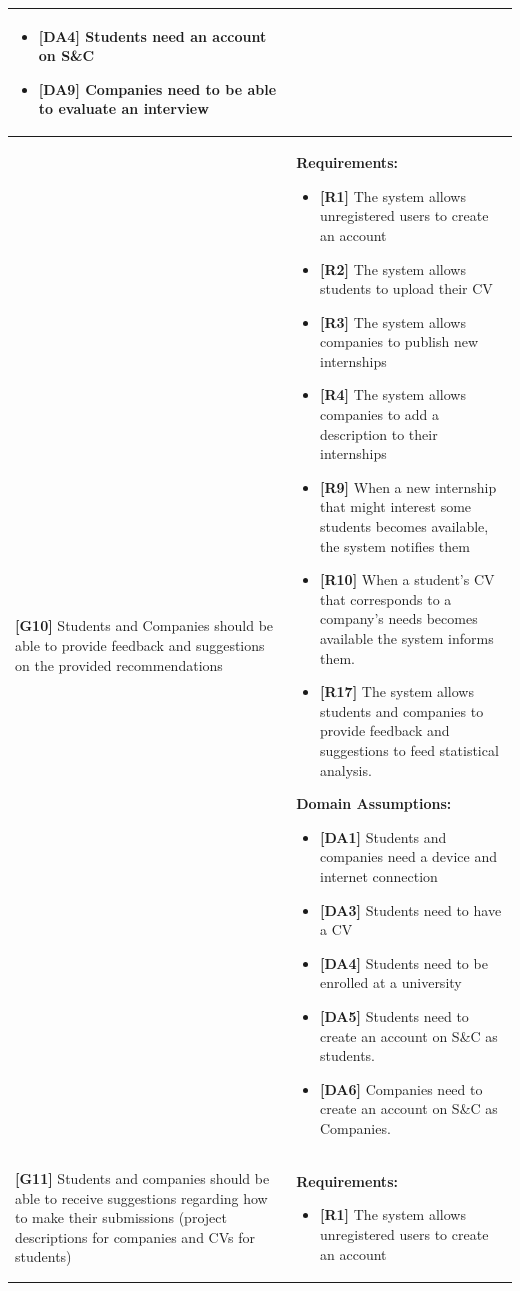 \begin{longtable}{|p{}|p{}|}
\begin{itemize}
    \item \textbf{[DA4]} Students need an account on S\&C
    \item \textbf{[DA9]} Companies need to be able to evaluate an interview
\end{itemize} \\
\hline
\textbf{[G10]} Students and Companies should be able to provide feedback and suggestions on the provided recommendations
& 
\textbf{Requirements:}
\begin{itemize}
    \item \textbf{[R1]} The system allows unregistered users to create an account
    \item \textbf{[R2]} The system allows students to upload their CV
    \item \textbf{[R3]} The system allows companies to publish new internships
    \item \textbf{[R4]} The system allows companies to add a description to their internships
    \item  \textbf{[R9]} When a new internship that might interest some students becomes available, the system notifies them
    \item  \textbf{[R10]} When a student’s CV that corresponds to a company’s needs becomes available the system informs them.
    \item \textbf{[R17]} The system allows students and companies to provide feedback and suggestions to feed statistical analysis.
\end{itemize}
\textbf{Domain Assumptions:}
\begin{itemize}
    \item \textbf{[DA1]} Students and companies need a device and internet connection
     \item \textbf{[DA3]} Students need to have a CV
     \item \textbf{[DA4]} Students need to be enrolled at a university
    \item \textbf{[DA5]} Students need to create an account on S\&C as students.
    \item \textbf{[DA6]} Companies need to create an account on S\&C as Companies.
\end{itemize} \\
\hline
\textbf{[G11]} Students and companies should be able to receive suggestions regarding how to make their submissions (project descriptions for companies and CVs for students)
& 
\textbf{Requirements:}
\begin{itemize}
    \item \textbf{[R1]} The system allows unregistered users to create an account

\end{itemize}
\end{longtable}
